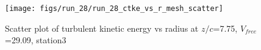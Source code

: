 \begin{figure}[H]
\centering
\texttt{[image: figs/run\_28/run\_28\_ctke\_vs\_r\_mesh\_scatter]}
\caption{Scatter plot of turbulent kinetic energy vs radius at $z/c$=7.75, $V_{free}$=29.09, station3}
\label{fig:run_28_ctke_vs_r_mesh_scatter}
\end{figure}


